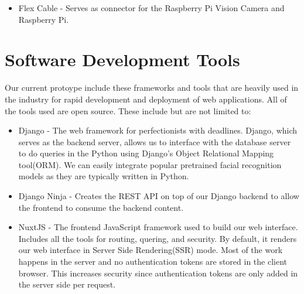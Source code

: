 \begin{itemize}
	\item	Flex Cable -  Serves as connector for the Raspberry Pi Vision Camera and Raspberry Pi. 
	
\end{itemize}
	
\section{Software Development Tools}
\label{sec:devtools}
 Our current protoype include these frameworks and tools that are heavily used in the industry for rapid development and deployment of web applications. All of the tools used are open source. These include but are not limited to:
 
\begin{itemize}
	\item	Django - The web framework for perfectionists with deadlines. Django, which serves as the backend server, allows us to interface with the database server to do queries in the Python using Django's Object Relational Mapping tool(ORM). We can easily integrate popular pretrained facial recognition models as they are typically written in Python.
\end{itemize}

\begin{itemize}
	\item	Django Ninja - Creates the REST API on top of our Django backend to allow the frontend to consume the backend content.
\end{itemize}

\begin{itemize}
	\item	NuxtJS - The frontend JavaScript framework used to build our web interface. Includes all the tools for routing, quering, and security. By default, it renders our web interface in Server Side Rendering(SSR) mode. Most of the work happens in the server and no authentication tokens are stored in the client browser. This increases security since authentication tokens are only added in the server side per request.
\end{itemize}
	
